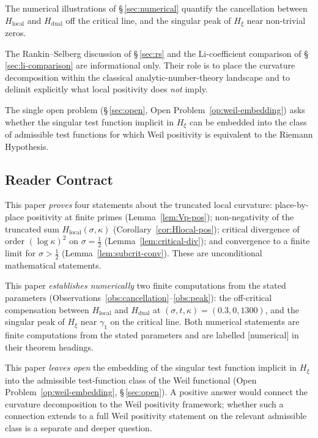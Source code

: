 \documentclass[11pt]{article}
\newcommand{\Hxi}{H_{\xi}}
\newcommand{\Hlocal}{H_{\mathrm{local}}}
\newcommand{\Hdual}{H_{\mathrm{dual}}}
\begin{document}
The numerical illustrations of \S\,\ref{sec:numerical}
quantify the cancellation between $\Hlocal$ and $\Hdual$
off the critical line, and the singular peak of $\Hxi$ near
non-trivial zeros.

The Rankin--Selberg discussion of \S\,\ref{sec:rs} and the
Li-coefficient comparison of \S\,\ref{sec:li-comparison} are
informational only.
Their role is to place the curvature decomposition within the
classical analytic-number-theory landscape and to delimit
explicitly what local positivity does \emph{not} imply.

The single open problem
(\S\,\ref{sec:open}, Open Problem~\ref{op:weil-embedding})
asks whether the singular test function implicit in $\Hxi$
can be embedded into the class of admissible test functions
for which Weil positivity is equivalent to the Riemann
Hypothesis.

\subsection{Reader Contract}
\label{sec:contract}

This paper \emph{proves} four statements about the truncated
local curvature: place-by-place positivity at finite primes
(Lemma~\ref{lem:Vp-pos}); non-negativity of the truncated
sum $\Hlocal(\sigma,\kappa)$ (Corollary~\ref{cor:Hlocal-pos});
critical divergence of order $(\log\kappa)^{2}$ on
$\sigma=\tfrac12$ (Lemma~\ref{lem:critical-div}); and
convergence to a finite limit for $\sigma>\tfrac12$
(Lemma~\ref{lem:subcrit-conv}).
These are unconditional mathematical statements.

This paper \emph{establishes numerically} two finite
computations from the stated parameters
(Observations~\ref{obs:cancellation}--\ref{obs:peak}):
the off-critical compensation between $\Hlocal$ and $\Hdual$
at $(\sigma,t,\kappa)=(0.3,0,1300)$, and the singular peak of
$\Hxi$ near $\gamma_1$ on the critical line.
Both numerical statements are finite computations from the
stated parameters and are labelled [numerical] in their
theorem headings.

This paper \emph{leaves open} the embedding of the singular
test function implicit in $\Hxi$ into the admissible
test-function class of the Weil functional
(Open Problem~\ref{op:weil-embedding}, \S\,\ref{sec:open}).
A positive answer would connect the curvature decomposition
to the Weil positivity framework; whether such a connection
extends to a full Weil positivity statement on the relevant
admissible class is a separate and deeper question.
\end{document}
